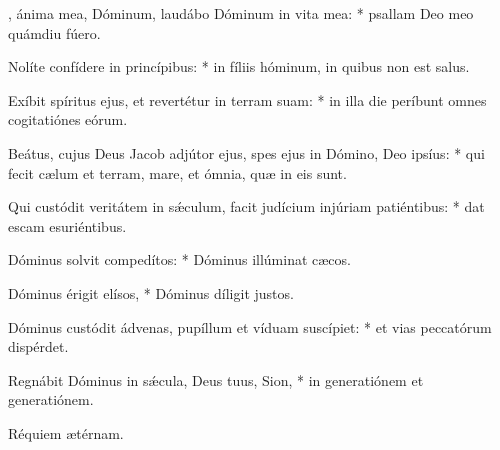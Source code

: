 \begin{psalmus}

, ánima mea, Dóminum, laudábo Dóminum in vita mea: * psallam Deo meo quámdiu fúero.

Nolíte confídere in princípibus: * in fíliis hóminum, in quibus non est salus.

Exíbit spíritus ejus, et revertétur in terram suam: * in illa die períbunt omnes cogitatiónes eórum.

Beátus, cujus Deus Jacob adjútor ejus, spes ejus in Dómino, Deo ipsíus: * qui fecit cælum et terram, mare, et ómnia, quæ in eis sunt.

Qui custódit veritátem in sǽculum, facit judícium injúriam patiéntibus: * dat escam esuriéntibus.

Dóminus solvit compedítos: * Dóminus illúminat cæcos.

Dóminus érigit elísos, * Dóminus díligit justos.

Dóminus custódit ádvenas, pupíllum et víduam suscípiet: * et vias peccatórum dispérdet.

Regnábit Dóminus in sǽcula, Deus tuus, Sion, * in generatiónem et generatiónem.

Réquiem ætérnam.

\end{psalmus}
